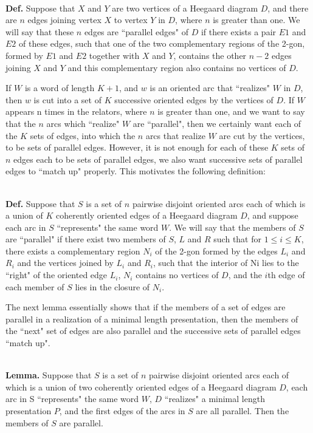 \documentclass[12pt]{amsart}
\newcommand{\definition}{\ \\ \noindent \textbf{Def.} }
\newcommand{\lemma}{\ \\ \noindent  \textbf{Lemma.} }
\begin{document}
        \definition     Suppose that $X$ and $Y$ are two vertices of a Heegaard diagram $D$, and there are $n$
        edges joining vertex $X$ to vertex $Y$ in $D$, where $n$ is greater than one. We will say that
        these $n$ edges are  ``parallel edges" of $D$ if there exists a pair $E1$ and $E2$ of these edges,
        such that one of the two complementary regions of the 2-gon, formed by $E1$  and $E2$ together
        with $X$ and $Y$, contains the other $n-2$ edges joining $X$ and $Y$ and this complementary region
        also contains no vertices of $D$.
        
                If $W$ is a word of length $K+1$, and $w$ is an oriented arc that  ``realizes" $W$ in $D$, then
        $w$ is cut into a set of $K$ successive oriented edges by the vertices of $D$. If $W$ appears n
        times in the relators, where $n$ is greater than one, and we want to say that the $n$ arcs
        which  ``realize" $W$ are  ``parallel", then we certainly want each of the $K$ sets of edges,
        into which the $n$ arcs that realize $W$ are cut by the vertices, to be sets of parallel
        edges. However, it is not enough for each of these $K$ sets of $n$ edges each to be sets of
        parallel edges, we also want successive sets of parallel edges to  ``match up" properly.
        This motivates the following definition:
        
        \definition     Suppose that $S$ is a set of $n$ pairwise disjoint oriented arcs each of which is
        a union of $K$ coherently oriented edges of a Heegaard diagram $D$, and suppose each arc
        in $S$  ``represents" the same word $W$. We will say that the members of $S$ are  ``parallel" if
        there exist two members of $S$, $L$ and $R$ such that for $1 \leq i \leq K$, there exists a
        complementary region $N_i$ of the 2-gon formed by the edges $L_i$ and $R_i$ and the vertices
        joined by $L_i$ and $R_i$, such that the interior of Ni lies to the  ``right" of the oriented
        edge $L_i$, $N_i$ contains no vertices of $D$, and the $i$th edge of each member of $S$ lies in 
        the closure of $N_i$. 
        
                The next lemma essentially shows that if the members of a set of edges are parallel
        in a realization of a minimal length presentation, then the members of the  ``next" set of
        edges are also parallel and the successive sets of parallel edges  ``match up".
        
        \lemma  Suppose that $S$ is a set of $n$ pairwise disjoint oriented arcs each of which is
        a union of two coherently oriented edges of a Heegaard diagram $D$, each arc in S
         ``represents" the same word $W$, $D$  ``realizes" a minimal length presentation $P$, and the
        first edges of the arcs in $S$ are all parallel. Then the members of $S$ are parallel.
        
\end{document}
